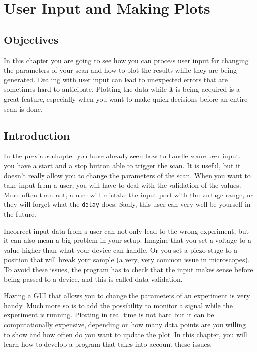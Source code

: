 \chapter{User Input and Making Plots}\label{chapter:user-input}

\section{Objectives}
In this chapter you are going to see how you can process user input for
changing the parameters of your scan and how to plot the results while
they are being generated. Dealing with user input can lead to unexpected
errors that are sometimes hard to anticipate. Plotting the data while it
is being acquired is a great feature, especially when you want to make
quick decisions before an entire scan is done.

\section{Introduction}
In the previous chapter you have already seen how to handle some user
input: you have a start and a stop button able to trigger the scan. It
is useful, but it doesn't really allow you to change the parameters of
the scan. When you want to take input from a user, you will have to deal
with the validation of the values. More often than not, a user will
mistake the input port with the voltage range, or they will forget what
the \texttt{delay} does. Sadly, this user can very well be yourself in
the future.

Incorrect input data from a user can not only lead to the wrong
experiment, but it can also mean a big problem in your setup. Imagine that
you set a voltage to a value higher than what your device can handle. Or
you set a piezo stage to a position that will break your sample (a very,
very common issue in microscopes). To avoid these issues, the program
has to check that the input makes sense before being passed to a device,
and this is called data validation.

Having a {GUI} that allows you to change the parameters of an experiment
is very handy. Much more so is to add the possibility to monitor a
signal while the experiment is running. Plotting in real time is not
hard but it can be computationally expensive, depending on how many data
points are you willing to show and how often do you want to update the
plot. In this chapter, you will learn how to develop a program that
takes into account these issues.

